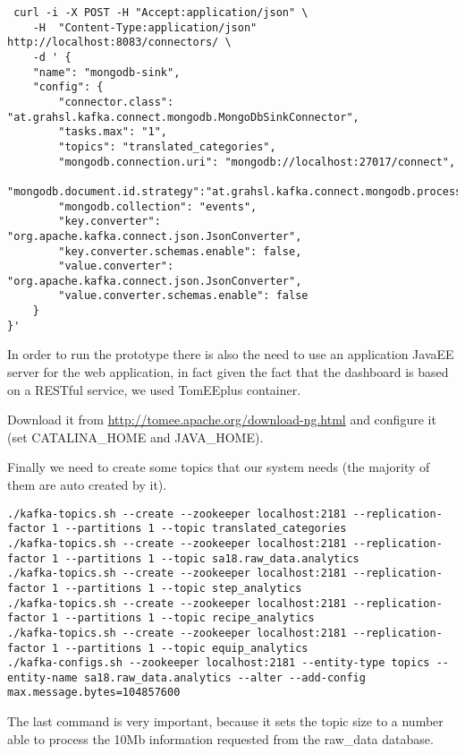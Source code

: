 \begin{appendices}
 \begin{lstlisting}
 curl -i -X POST -H "Accept:application/json" \
    -H  "Content-Type:application/json" http://localhost:8083/connectors/ \
    -d ' {
    "name": "mongodb-sink",
    "config": {
        "connector.class": "at.grahsl.kafka.connect.mongodb.MongoDbSinkConnector",
        "tasks.max": "1",
        "topics": "translated_categories",
        "mongodb.connection.uri": "mongodb://localhost:27017/connect",
        "mongodb.document.id.strategy":"at.grahsl.kafka.connect.mongodb.processor.id.strategy.BsonOidStrategy",
        "mongodb.collection": "events",
        "key.converter": "org.apache.kafka.connect.json.JsonConverter",
        "key.converter.schemas.enable": false,
        "value.converter": "org.apache.kafka.connect.json.JsonConverter",
        "value.converter.schemas.enable": false
    }
}'
 \end{lstlisting}

In order to run the prototype there is also the need to use an application JavaEE server for the web application, in fact given the fact that the dashboard is based on a RESTful service, we used TomEEplus container.

Download it from \url{http://tomee.apache.org/download-ng.html} and configure it (set CATALINA\_HOME and JAVA\_HOME).

Finally we need to create some topics that our system needs (the majority of them are auto created by it).

\begin{lstlisting}
./kafka-topics.sh --create --zookeeper localhost:2181 --replication-factor 1 --partitions 1 --topic translated_categories
./kafka-topics.sh --create --zookeeper localhost:2181 --replication-factor 1 --partitions 1 --topic sa18.raw_data.analytics
./kafka-topics.sh --create --zookeeper localhost:2181 --replication-factor 1 --partitions 1 --topic step_analytics
./kafka-topics.sh --create --zookeeper localhost:2181 --replication-factor 1 --partitions 1 --topic recipe_analytics
./kafka-topics.sh --create --zookeeper localhost:2181 --replication-factor 1 --partitions 1 --topic equip_analytics
./kafka-configs.sh --zookeeper localhost:2181 --entity-type topics --entity-name sa18.raw_data.analytics --alter --add-config max.message.bytes=104857600
\end{lstlisting}

The last command is very important, because it sets the topic size to a number able to process the 10Mb information requested from the raw\_data database.


\end{appendices}
 
 
 